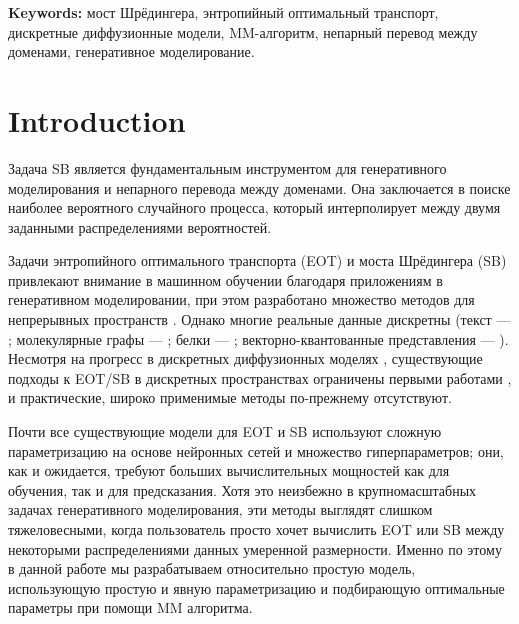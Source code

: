 \documentclass{article}
\begin{document}
\textbf{Keywords:}  мост Шрёдингера, энтропийный оптимальный транспорт, дискретные диффузионные модели, MM-алгоритм, непарный перевод между доменами, генеративное моделирование.

\section{Introduction}\label{sec:intro}

Задача SB является фундаментальным инструментом для генеративного моделирования и непарного перевода между доменами. Она заключается в поиске наиболее вероятного случайного процесса, который интерполирует между двумя заданными распределениями вероятностей.

Задачи энтропийного оптимального транспорта (EOT) и моста Шрёдингера (SB) привлекают внимание в машинном обучении благодаря приложениям в генеративном моделировании, при этом разработано множество методов для непрерывных пространств \cite{daniels2021score, gushchin2023entropic, gushchin2024adversarial, mokrov2024energy, vargas2021solving, chen2021likelihood, shi2023diffusion, debortoli2024schrodinger, lightSB}. Однако многие реальные данные дискретны (текст — \cite{austin2021structured, gat2024discrete}; молекулярные графы — \cite{vignac2022digress, qin2024defog, luo2024crystalflow}; белки — \cite{campbell2022continuous}; векторно-квантованные представления — \cite{vandenoord2017neural, esser2021taming}).
Несмотря на прогресс в дискретных диффузионных моделях \cite{hoogeboom2021argmax, austin2021structured, campbell2022continuous, lou2023discrete, sahoo2024simple, campbell2024generative, gat2024discrete}, существующие подходы к EOT/SB в дискретных пространствах ограничены первыми работами \cite{kim2024discrete, ksenofontov2025categorical}, и практические, широко применимые методы по-прежнему отсутствуют.

Почти все существующие модели для EOT и SB используют сложную параметризацию на основе нейронных сетей и множество гиперпараметров; они, как и ожидается, требуют больших вычислительных мощностей как для обучения, так и для предсказания. Хотя это неизбежно в крупномасштабных задачах генеративного моделирования, эти методы выглядят слишком тяжеловесными, когда пользователь просто хочет вычислить EOT или SB между некоторыми распределениями данных умеренной размерности. Именно по этому в данной работе мы разрабатываем относительно простую модель, использующую простую и явную параметризацию и подбирающую оптимальные параметры при помощи MM алгоритма. 
\end{document}
